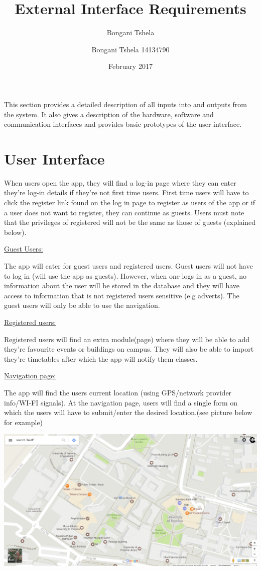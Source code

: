 \documentclass[11pt]{article}
\author{Bongani Tshela}
\title{}
\title{External Interface Requirements}
\author{Bongani Tshela 14134790 }
\date{February 2017}
\begin{document}
\maketitle

This section provides a detailed description of all inputs into and outputs from
the system. It also gives a description of the hardware, software and
communication interfaces and provides basic prototypes of the user interface.

\section{User Interface}

{\raggedright
When users open the app, they will find a log-in page where they can enter they're log-in details if they're not first time users. First time users will have to click the register link found on the log in page to register as users of the app or if a user does not want to register, they can continue as guests. Users must note that the privileges of registered will not be the same as those of guests (explained below). 
}

{\raggedright
\uline{Guest Users:}}

{\raggedright
The app will cater for guest users and registered users. Guest users will not have to log in (will use the app as guests). However, when one logs in as a guest, no information about the user will be stored in the database and they will have access to information that is not registered users sensitive (e.g adverts). The guest users will only be able to use the navigation.
}

{\raggedright

}

{\raggedleft
\uline{Registered users:}}

{\raggedright
Registered users will find an extra module(page) where they will be able to add they're favourite events or buildings on campus. They will also be able to import they're timetables after which the app will notify them classes.
}

{\raggedright
\uline{Navigation page:}}

The app will find the users current location (using GPS/network provider info/WI-FI signals). At the navigation page, users will find a single form on which the users will have to submit/enter the desired location.(see picture below for example)

\includegraphics{1.png}
\end{document}
